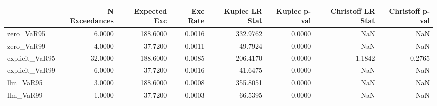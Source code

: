 \begin{tabular}{lrrrrrrr}
\toprule
 & N Exceedances & Expected Exc & Exc Rate & Kupiec LR Stat & Kupiec p-val & Christoff LR Stat & Christoff p-val \\
\midrule
zero_VaR95 & 6.0000 & 188.6000 & 0.0016 & 332.9762 & 0.0000 & NaN & NaN \\
zero_VaR99 & 4.0000 & 37.7200 & 0.0011 & 49.7924 & 0.0000 & NaN & NaN \\
explicit_VaR95 & 32.0000 & 188.6000 & 0.0085 & 206.4170 & 0.0000 & 1.1842 & 0.2765 \\
explicit_VaR99 & 6.0000 & 37.7200 & 0.0016 & 41.6475 & 0.0000 & NaN & NaN \\
llm_VaR95 & 3.0000 & 188.6000 & 0.0008 & 355.8051 & 0.0000 & NaN & NaN \\
llm_VaR99 & 1.0000 & 37.7200 & 0.0003 & 66.5395 & 0.0000 & NaN & NaN \\
\bottomrule
\end{tabular}
